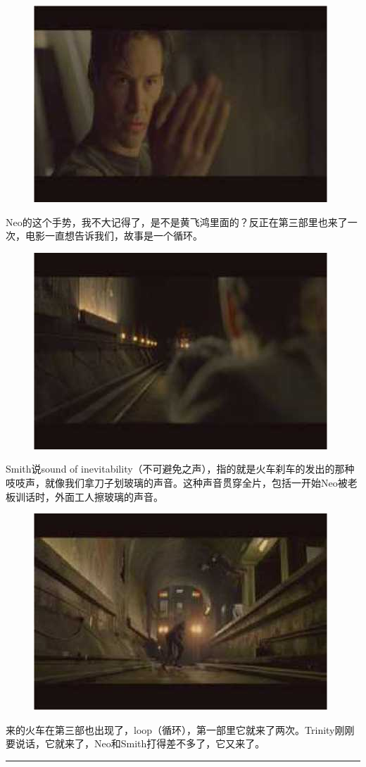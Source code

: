 \documentclass{ctexart}
\newcommand{\myparsep}{\noindent \rule[0.5ex]{\linewidth}{1pt}}
\begin{document}
\begin{figure}[htb]
\centering
\includegraphics[width=0.5\linewidth]{fig/read_Matrix-74}
\end{figure}

Neo的这个手势，我不大记得了，是不是黄飞鸿里面的？反正在第三部里也来了一次，电影一直想告诉我们，故事是一个循环。

\begin{figure}[htb]
\centering
\includegraphics[width=0.5\linewidth]{fig/read_Matrix-75}
\end{figure}

Smith说sound of inevitability（不可避免之声），指的就是火车刹车的发出的那种吱吱声，就像我们拿刀子划玻璃的声音。这种声音贯穿全片，包括一开始Neo被老板训话时，外面工人擦玻璃的声音。

\begin{figure}[htb]
\centering
\includegraphics[width=0.5\linewidth]{fig/read_Matrix-76}
\end{figure}

来的火车在第三部也出现了，loop（循环），第一部里它就来了两次。Trinity刚刚要说话，它就来了，Neo和Smith打得差不多了，它又来了。

\myparsep
\end{document}
